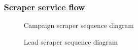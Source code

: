 \subsubsection*{\underline{Scraper service flow}}
\begin{figure}[H]
	\centering
	\caption{Campaign scraper sequence diagram}
	\label{fig:campaign-scraper-sequence-diagram}
\end{figure}
\begin{figure}[H]
	\centering
	\caption{Lead scraper sequence diagram}
	\label{fig:lead-scraper-sequence-diagram}
\end{figure}
